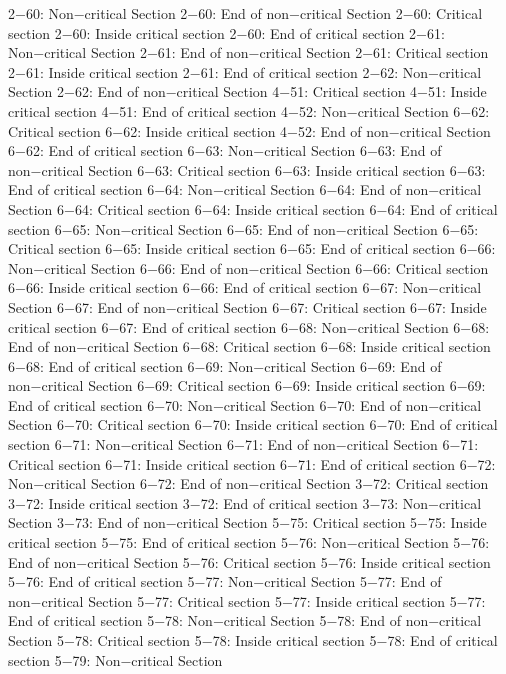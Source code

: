 2−60: Non−critical Section
2−60: End of non−critical Section
2−60: Critical section
2−60: Inside critical section
2−60: End of critical section
2−61: Non−critical Section
2−61: End of non−critical Section
2−61: Critical section
2−61: Inside critical section
2−61: End of critical section
2−62: Non−critical Section
2−62: End of non−critical Section
4−51: Critical section
4−51: Inside critical section
4−51: End of critical section
4−52: Non−critical Section
6−62: Critical section
6−62: Inside critical section
4−52: End of non−critical Section
6−62: End of critical section
6−63: Non−critical Section
6−63: End of non−critical Section
6−63: Critical section
6−63: Inside critical section
6−63: End of critical section
6−64: Non−critical Section
6−64: End of non−critical Section
6−64: Critical section
6−64: Inside critical section
6−64: End of critical section
6−65: Non−critical Section
6−65: End of non−critical Section
6−65: Critical section
6−65: Inside critical section
6−65: End of critical section
6−66: Non−critical Section
6−66: End of non−critical Section
6−66: Critical section
6−66: Inside critical section
6−66: End of critical section
6−67: Non−critical Section
6−67: End of non−critical Section
6−67: Critical section
6−67: Inside critical section
6−67: End of critical section
6−68: Non−critical Section
6−68: End of non−critical Section
6−68: Critical section
6−68: Inside critical section
6−68: End of critical section
6−69: Non−critical Section
6−69: End of non−critical Section
6−69: Critical section
6−69: Inside critical section
6−69: End of critical section
6−70: Non−critical Section
6−70: End of non−critical Section
6−70: Critical section
6−70: Inside critical section
6−70: End of critical section
6−71: Non−critical Section
6−71: End of non−critical Section
6−71: Critical section
6−71: Inside critical section
6−71: End of critical section
6−72: Non−critical Section
6−72: End of non−critical Section
3−72: Critical section
3−72: Inside critical section
3−72: End of critical section
3−73: Non−critical Section
3−73: End of non−critical Section
5−75: Critical section
5−75: Inside critical section
5−75: End of critical section
5−76: Non−critical Section
5−76: End of non−critical Section
5−76: Critical section
5−76: Inside critical section
5−76: End of critical section
5−77: Non−critical Section
5−77: End of non−critical Section
5−77: Critical section
5−77: Inside critical section
5−77: End of critical section
5−78: Non−critical Section
5−78: End of non−critical Section
5−78: Critical section
5−78: Inside critical section
5−78: End of critical section
5−79: Non−critical Section

